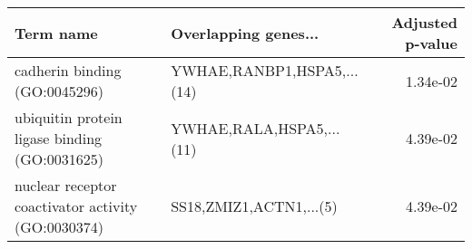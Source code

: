 \begin{tabular}{llr}
\toprule
                                         Term name &       Overlapping genes... &  Adjusted p-value \\
\midrule
                     cadherin binding (GO:0045296) & YWHAE,RANBP1,HSPA5,...(14) &          1.34e-02 \\
     ubiquitin protein ligase binding (GO:0031625) &   YWHAE,RALA,HSPA5,...(11) &          4.39e-02 \\
nuclear receptor coactivator activity (GO:0030374) &    SS18,ZMIZ1,ACTN1,...(5) &          4.39e-02 \\
\bottomrule
\end{tabular}

